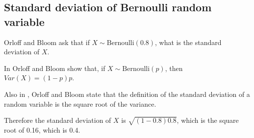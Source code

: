 \documentclass[a4paper,11pt]{article}
\begin{document}
\subsection{Standard deviation of Bernoulli random variable}
Orloff and Bloom ask that if $X \sim \text{Bernoulli}\left( 0.8 \right)$,
what is the standard deviation of $X$.

In \cite{reading5a} Orloff and Bloom show that, if
$X \sim \text{Bernoulli}\left( p \right)$, then
$Var \left( X \right) = \left(1 - p \right) p$.

Also in \cite{reading5a}, Orloff and Bloom state that the definition of the
standard deviation of a random variable is the square root of the variance.

Therefore the standard deviation of $X$ is $\sqrt{\left( 1 - 0.8 \right)0.8}$,
which is the square root of 0.16, which is 0.4.
\printbibliography{}
\end{document}

